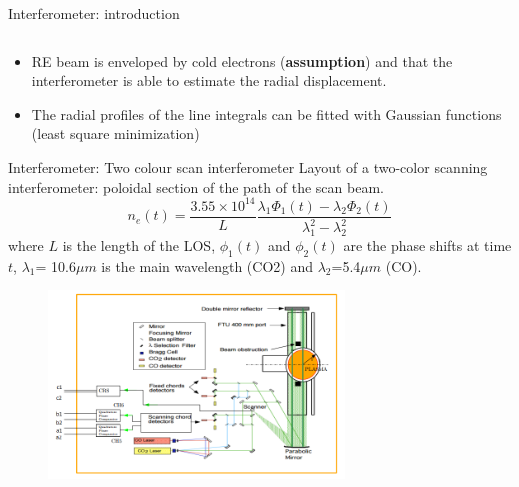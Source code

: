 \documentclass{beamer}
\begin{document}
\begin{frame}{Interferometer: introduction}
\begin{columns}
\begin{column}{0.5\textwidth}
	\end{column}
\end{columns} 	

\begin{itemize}
    \item RE beam is enveloped by cold electrons (\textbf{assumption}) and that the interferometer is able to estimate the radial displacement.
    \item The radial profiles of the line integrals can be fitted with Gaussian functions (least square minimization)
\end{itemize}

		
\end{frame}	


\begin{frame}{Interferometer: Two colour scan interferometer}
\scriptsize
Layout of a two-color scanning interferometer: poloidal section of the path of the scan beam.
$$n_e(t) = \frac{3.55\times10^{14}}{L} \frac{\lambda_1 \Phi_1(t)-\lambda_2 \Phi_2(t)}{\lambda^2_1-\lambda^2_2}$$  where $L$ is the length of the LOS, $\phi_1(t)$ and $\phi_2(t)$ are the phase shifts at time $t$, $\lambda_1$= 10.6$\mu m$ is the main wavelength (CO2) and $\lambda_2$=5.4$\mu m$ (CO).
\begin{figure}
	\centering
	\includegraphics[width=0.7\textwidth]{inter/interf_HARDWARE.png}
\end{figure}


\end{frame}
\end{document}
